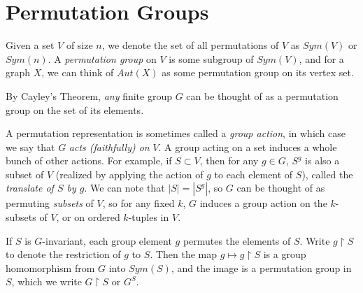 \renewcommand{\exc}[1]{\subsubsection*{Exercise 2.#1}}


\section*{Permutation Groups}

Given a set $V$ of size $n$, we denote the set of all permutations of $V$ as $Sym(V)$ or $Sym(n)$.  A \textit{permutation group} on $V$ is some subgroup of $Sym(V)$, and for a graph $X$, we can think of $Aut(X)$ as some permutation group on its vertex set.

By Cayley's Theorem, \textit{any} finite group $G$ can be thought of as a permutation group on the set of its elements.  


A permutation representation is sometimes called a \textit{group action}, in which case we say that $G$ \textit{acts (faithfully) on} $V$.  A group acting on a set induces a whole bunch of other actions.  For example, if $S\subset V$, then for any $g\in G$, $S^g$ is also a subset of $V$ (realized by applying the action of $g$ to each element of $S$), called the \textit{translate of $S$ by $g$}.  We can note that $|S|=|S^g|$, so $G$ can be thought of as permuting \textit{subsets} of $V$, so for any fixed $k$, $G$ induces a group action on the $k$-subsets of $V$, or on ordered $k$-tuples in $V$.


If $S$ is $G$-invariant, each group element $g$ permutes the elements of $S$.  Write $g{\upharpoonright} S$ to denote the restriction of $g$ to $S$.  Then the map $g\mapsto g{\upharpoonright} S$ is a group homomorphism from $G$ into $Sym(S)$, and the image is a permutation group in $S$, which we write $G{\upharpoonright} S$ or $G^S$.

